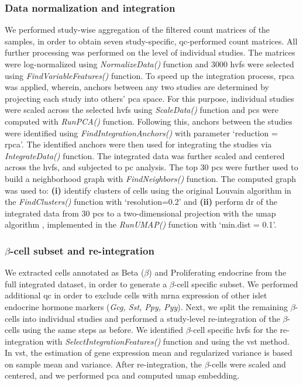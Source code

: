 \subsubsection{\large Data normalization and integration}
\label{subsubsec:met_chp3_integration}
We performed study-wise aggregation of the filtered count matrices of the samples, in order to obtain seven study-specific, \gls{qc}-performed count matrices. All further processing was performed on the level of individual studies. The matrices were log-normalized using \textit{NormalizeData()} function and 3000 \glspl{hvf} were selected using \textit{FindVariableFeatures()} function. To speed up the integration process, \gls{rpca} was applied, wherein, anchors between any two studies are determined by projecting each study into others’ \gls{pca} space. For this purpose, individual studies were scaled across the selected \glspl{hvf} using \textit{ScaleData()} function and \glspl{pc} were computed with \textit{RunPCA()} function. Following this, anchors between the studies were identified using \textit{FindIntegrationAnchors()} with parameter `reduction = rpca'. The identified anchors were then used for integrating the studies via \textit{IntegrateData()} function. The integrated data was further scaled and centered across the \glspl{hvf}, and subjected to \gls{pc} analysis. The top 30 \glspl{pc} were further used to build a neighborhood graph with \textit{FindNeighbors()} function. The computed graph was used to: \textbf{(i)} identify clusters of cells using the original Louvain algorithm \textbf{\cite{blondel_fast_2008}} in the \textit{FindClusters()} function with `resolution=0.2' and \textbf{(ii)} perform \gls{dr} of the integrated data from 30 \glspl{pc} to a two-dimensional projection with the \gls{umap} algorithm \textbf{\cite{mcinnes_umap_2018}}, implemented in the \textit{RunUMAP()} function with `min.dist = 0.1'.

\subsubsection{\large $\beta$-cell subset and re-integration}
\label{subsubsec:met_chp3_betareint}
\par We extracted cells annotated as Beta ($\beta$) and Proliferating endocrine from the full integrated dataset, in order to generate a $\beta$-cell specific subset. We performed additional \gls{qc} in order to exclude cells with \gls{mrna} expression of other islet endocrine hormone markers (\textit{Gcg, Sst, Ppy, Pyy}). Next, we split the remaining $\beta$-cells into individual studies and performed a study-level re-integration of the $\beta$-cells using the same steps as before. We identified $\beta$-cell specific \glspl{hvf} for the re-integration with \textit{SelectIntegrationFeatures()} function and using the \gls{vst} method. In \gls{vst}, the estimation of gene expression mean and regularized variance is based on sample mean and variance. After re-integration, the $\beta$-cells were scaled and centered, and we performed \gls{pca} and computed \gls{umap} embedding.\\

